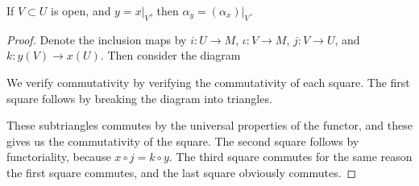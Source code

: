 \begin{lemma}
    If $V \subset U$ is open, and $y = x|_V$, then $\alpha_y = (\alpha_x)|_V$.
\end{lemma}
\begin{proof}
    Denote the inclusion maps by $i: U \to M$, $\iota: V \to M$, $j : V \to U$, and $k : y(V) \to x(U)$. Then consider the diagram
    \begin{center}
    \end{center}
    We verify commutativity by verifying the commutativity of each square. The first square follows by breaking the diagram into triangles.
    \begin{center}
    \end{center}
    These subtriangles commutes by the universal properties of the functor, and these gives us the commutativity of the square. The second square follows by functoriality, because $x \circ j = k \circ y$. The third square commutes for the same reason the first square commutes, and the last square obviously commutes.
\end{proof}

